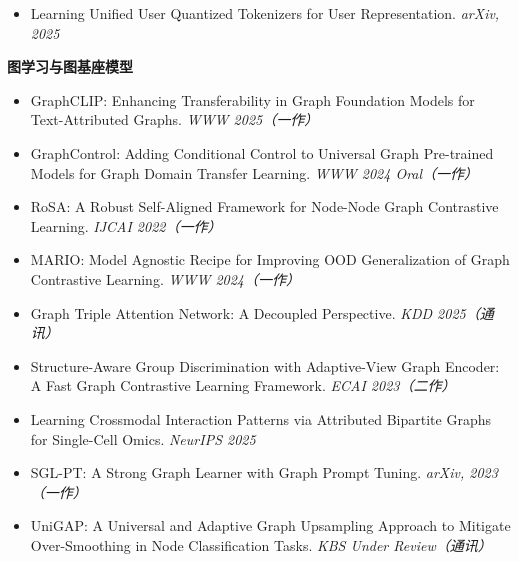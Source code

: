 \documentclass[UTF8]{ctexart}
\newcommand{\pubitem}[2]{\item #1 \textit{#2}}
\newcommand{\pubgroup}[1]{\vspace{0.18em}\textbf{#1}\par}
\begin{document}
{\begin{itemize}[leftmargin=1.2em,itemsep=0.12em,topsep=1.5pt]
  \pubitem{Learning Unified User Quantized Tokenizers for User Representation.}{arXiv, 2025}
\end{itemize}
\pubgroup{图学习与图基座模型}
\begin{itemize}[leftmargin=1.2em,itemsep=0.12em,topsep=1.5pt]
  \pubitem{GraphCLIP: Enhancing Transferability in Graph Foundation Models for Text-Attributed Graphs.}{WWW 2025（一作）}
  \pubitem{GraphControl: Adding Conditional Control to Universal Graph Pre-trained Models for Graph Domain Transfer Learning.}{WWW 2024 Oral（一作）}
  \pubitem{RoSA: A Robust Self-Aligned Framework for Node-Node Graph Contrastive Learning.}{IJCAI 2022（一作）}
  \pubitem{MARIO: Model Agnostic Recipe for Improving OOD Generalization of Graph Contrastive Learning.}{WWW 2024（一作）}
  \pubitem{Graph Triple Attention Network: A Decoupled Perspective.}{KDD 2025（通讯）}
  \pubitem{Structure-Aware Group Discrimination with Adaptive-View Graph Encoder: A Fast Graph Contrastive Learning Framework.}{ECAI 2023（二作）}
  \pubitem{Learning Crossmodal Interaction Patterns via Attributed Bipartite Graphs for Single-Cell Omics.}{NeurIPS 2025}
  \pubitem{SGL-PT: A Strong Graph Learner with Graph Prompt Tuning.}{arXiv, 2023（一作）}
  \pubitem{UniGAP: A Universal and Adaptive Graph Upsampling Approach to Mitigate Over-Smoothing in Node Classification Tasks.}{KBS Under Review（通讯）}
\end{itemize}
}
\end{document}

